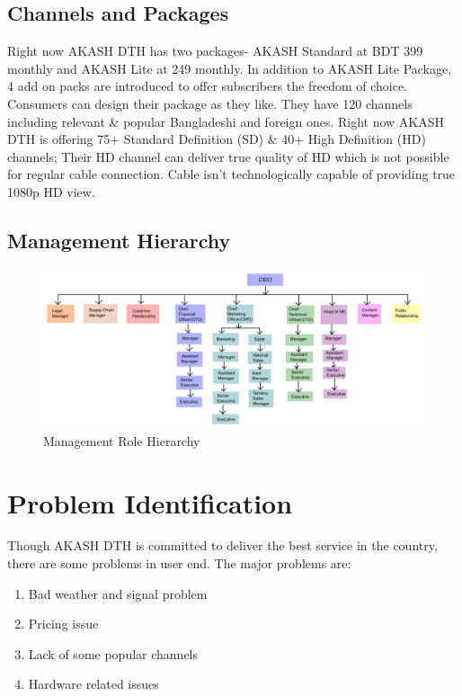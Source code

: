 \begin{spacing}{1.0}
\subsection{Channels and Packages}
Right now AKASH DTH has two packages- AKASH Standard at BDT 399 monthly and AKASH Lite at 249 monthly. In addition to AKASH Lite Package, 4 add on packs are introduced to offer subscribers the freedom of choice. Consumers can design their package as they like.
They have 120 channels including relevant \& popular Bangladeshi and foreign ones. 
Right now AKASH DTH is offering 75+ Standard Definition (SD) \& 40+ High Definition (HD) channels; Their HD channel can deliver true quality of HD which is not possible for regular cable connection. Cable isn't technologically capable of providing true 1080p HD view. 

\subsection{Management Hierarchy}
\begin{figure}[H]
	\centering
	\includegraphics[width=\textwidth]{hierarchy}
	\caption{Management Role Hierarchy}
	\label{fig:hierarchy}
\end{figure}

\section{Problem Identification}
Though AKASH DTH is committed to deliver the best service in the country, there are some problems in user end. The major problems are:
\begin{enumerate}

\item Bad weather and signal problem
\item Pricing issue
\item Lack of some popular channels
\item Hardware related issues


\end{enumerate}
\end{spacing}
